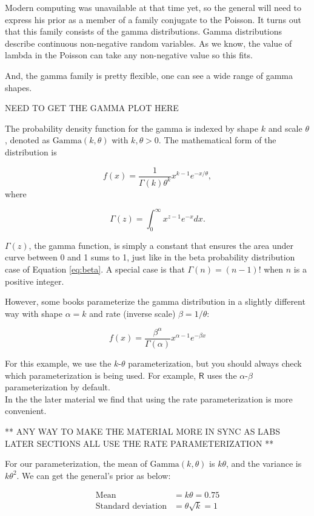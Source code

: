 \documentclass[]{book}
\theoremstyle{definition}
\theoremstyle{definition}
\theoremstyle{remark}
\begin{document}
Modern computing was unavailable at that time yet, so the general will
need to express his prior as a member of a family conjugate to the
Poisson. It turns out that this family consists of the gamma
distributions. Gamma distributions describe continuous non-negative
random variables. As we know, the value of lambda in the Poisson can
take any non-negative value so this fits.

And, the gamma family is pretty flexible, one can see a wide range of
gamma shapes.

NEED TO GET THE GAMMA PLOT HERE

The probability density function for the gamma is indexed by shape \(k\)
and scale \(\theta\), denoted as \(\text{Gamma}(k,\theta)\) with
\(k,\theta > 0\). The mathematical form of the distribution is

\[f(x) = \dfrac{1}{\Gamma(k)\theta^k} x^{k-1} e^{-x/\theta},\] where

\[\Gamma(z) = \int^{\infty}_0 x^{z-1} e^{-x} dx.\]

\(\Gamma(z)\), the gamma function, is simply a constant that ensures the
area under curve between 0 and 1 sums to 1, just like in the beta
probability distribution case of Equation \eqref{eq:beta}. A special case
is that \(\Gamma(n) = (n-1)!\) when \(n\) is a positive integer.

However, some books parameterize the gamma distribution in a slightly
different way with shape \(\alpha = k\) and rate (inverse scale)
\(\beta=1/\theta\):

\[f(x) = \frac{\beta^{\alpha}}{\Gamma(\alpha)} x^{\alpha-1} e^{-\beta x}\]

For this example, we use the \(k\)-\(\theta\) parameterization, but you
should always check which parameterization is being used. For example,
\(\mathsf{R}\) uses the \(\alpha\)-\(\beta\) parameterization by
default.\\
In the the later material we find that using the rate parameterization
is more convenient.

** ANY WAY TO MAKE THE MATERIAL MORE IN SYNC AS LABS LATER SECTIONS ALL
USE THE RATE PARAMETERIZATION **

For our parameterization, the mean of \(\text{Gamma}(k,\theta)\) is
\(k\theta\), and the variance is \(k\theta^2\). We can get the general's
prior as below:

\[\begin{aligned}
\text{Mean} &= k\theta = 0.75 \\
\text{Standard deviation} &= \theta\sqrt{k} = 1
\end{aligned}\]
\end{document}
